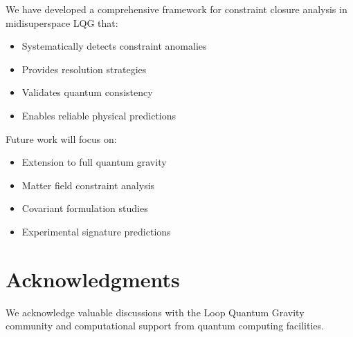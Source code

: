\documentclass[11pt]{article}
\begin{document}
We have developed a comprehensive framework for constraint closure analysis in midisuperspace LQG that:

\begin{itemize}
\item Systematically detects constraint anomalies
\item Provides resolution strategies
\item Validates quantum consistency
\item Enables reliable physical predictions
\end{itemize}

Future work will focus on:
\begin{itemize}
\item Extension to full quantum gravity
\item Matter field constraint analysis
\item Covariant formulation studies
\item Experimental signature predictions
\end{itemize}

\section*{Acknowledgments}

We acknowledge valuable discussions with the Loop Quantum Gravity community and computational support from quantum computing facilities.



\end{document}
